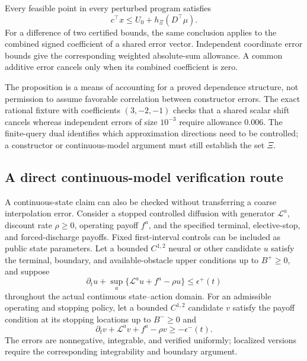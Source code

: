 \begin{proposition}
\label{prop:directederror}
Every feasible point in every perturbed program satisfies
\begin{equation}
 c^\top x\leq U_0+h_\Xi(D^\top\mu).
 \label{eq:directederror}
\end{equation}
For a difference of two certified bounds, the same conclusion applies to the combined signed coefficient of a shared error vector. Independent coordinate error bounds give the corresponding weighted absolute-sum allowance. A common additive error cancels only when its combined coefficient is zero.
\end{proposition}

The proposition is a means of accounting for a proved dependence structure, not permission to assume favorable correlation between constructor errors. The exact rational fixture with coefficients $(3,-2,-1)$ checks that a shared scalar shift cancels whereas independent errors of size $10^{-3}$ require allowance $0.006$. The finite-query dual identifies which approximation directions need to be controlled; a constructor or continuous-model argument must still establish the set $\Xi$.

\subsection{A direct continuous-model verification route}
\label{sec:continuousbarriers}
A continuous-state claim can also be checked without transferring a coarse interpolation error. Consider a stopped controlled diffusion with generator $\mathcal L^a$, discount rate $\rho\geq0$, operating payoff $f^a$, and the specified terminal, elective-stop, and forced-discharge payoffs. Fixed first-interval controls can be included as public state parameters. Let a bounded $C^{1,2}$ neural or other candidate $u$ satisfy the terminal, boundary, and available-obstacle upper conditions up to $B^+\geq0$, and suppose
\[
 \partial_tu+\sup_a\{\mathcal L^au+f^a-\rho u\}\leq\epsilon^+(t)
\]
throughout the actual continuous state--action domain. For an admissible operating and stopping policy, let a bounded $C^{1,2}$ candidate $v$ satisfy the payoff condition at its stopping locations up to $B^-\geq0$ and
\[
 \partial_tv+\mathcal L^{a}v+f^{a}-\rho v\geq-\epsilon^-(t).
\]
The errors are nonnegative, integrable, and verified uniformly; localized versions require the corresponding integrability and boundary argument.

